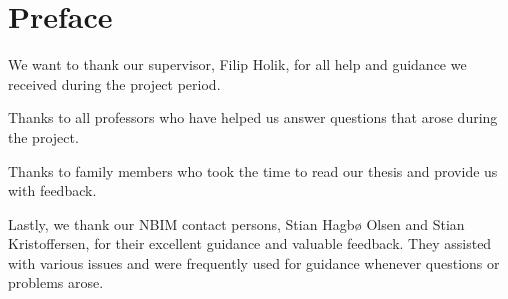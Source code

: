 \chapter*{Preface}

We want to thank our supervisor, Filip Holik, for all help and guidance we received during the project period. 

Thanks to all professors who have helped us answer questions that arose during the project. 

Thanks to family members who took the time to read our thesis and provide us with feedback.

Lastly, we thank our NBIM contact persons, Stian Hagbø Olsen and Stian Kristoffersen, for their excellent guidance and valuable feedback. They assisted with various issues and were frequently used for guidance whenever questions or problems arose.

\newpage